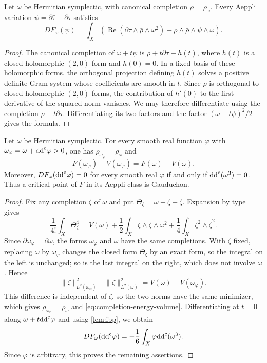 \begin{lemma}\label{lem:completion-first-variation}
Let $\omega$ be Hermitian symplectic, with canonical completion $\rho=\rho_\omega$. Every Aeppli variation $\psi=\partial\bar\tau+\bar\partial\tau$ satisfies
\begin{equation}\label{eq:completion-first-variation}
 DF_\omega(\psi)=\int_X\left(
  \operatorname{Re}(\partial\tau\wedge\bar\rho\wedge\omega^2)
  +\rho\wedge\bar\rho\wedge\psi\wedge\omega\right).
\end{equation}
\end{lemma}
\begin{proof}
The canonical completion of $\omega+t\psi$ is $\rho+t\partial\tau-h(t)$, where $h(t)$ is a closed holomorphic $(2,0)$-form and $h(0)=0$. In a fixed basis of these holomorphic forms, the orthogonal projection defining $h(t)$ solves a positive definite Gram system whose coefficients are smooth in $t$. Since $\rho$ is orthogonal to closed holomorphic $(2,0)$-forms, the contribution of $h'(0)$ to the first derivative of the squared norm vanishes. We may therefore differentiate using the completion $\rho+t\partial\tau$. Differentiating its two factors and the factor $(\omega+t\psi)^2/2$ gives the formula.
\end{proof}

\begin{proposition}\label{prop:completion-energy-volume}
Let $\omega$ be Hermitian symplectic. For every smooth real function $\varphi$ with $\omega_\varphi=\omega+\mathrm{dd}^{\mathrm{c}}\varphi>0$, one has $\rho_{\omega_\varphi}=\rho_\omega$ and
\begin{equation}\label{eq:completion-energy-volume}
 F(\omega_\varphi)+V(\omega_\varphi)=F(\omega)+V(\omega).
\end{equation}
Moreover, $DF_\omega(\mathrm{dd}^{\mathrm{c}}\varphi)=0$ for every smooth real $\varphi$ if and only if $\mathrm{dd}^{\mathrm{c}}(\omega^3)=0$. Thus a critical point of $F$ in its Aeppli class is Gauduchon.
\end{proposition}
\begin{proof}
Fix any completion $\zeta$ of $\omega$ and put $\Theta_\zeta=\omega+\zeta+\bar\zeta$. Expansion by type gives
\[
 \frac1{4!}\int_X\Theta_\zeta^4
 =V(\omega)+\frac12\int_X\zeta\wedge\bar\zeta\wedge\omega^2
       +\frac14\int_X\zeta^2\wedge\bar\zeta^2.
\]
Since $\partial\omega_\varphi=\partial\omega$, the forms $\omega_\varphi$ and $\omega$ have the same completions. With $\zeta$ fixed, replacing $\omega$ by $\omega_\varphi$ changes the closed form $\Theta_\zeta$ by an exact form, so the integral on the left is unchanged; so is the last integral on the right, which does not involve $\omega$. Hence
\[
 \|\zeta\|_{L^2(\omega_\varphi)}^2
 -\|\zeta\|_{L^2(\omega)}^2=V(\omega)-V(\omega_\varphi).
\]
This difference is independent of $\zeta$, so the two norms have the same minimizer, which gives $\rho_{\omega_\varphi}=\rho_\omega$ and \eqref{eq:completion-energy-volume}. Differentiating at $t=0$ along $\omega+t\mathrm{dd}^{\mathrm{c}}\varphi$ and using \cref{lem:ibp}, we obtain
\[
 DF_\omega(\mathrm{dd}^{\mathrm{c}}\varphi)=-\frac16\int_X\varphi\mathrm{dd}^{\mathrm{c}}(\omega^3).
\]
Since $\varphi$ is arbitrary, this proves the remaining assertions.
\end{proof}

